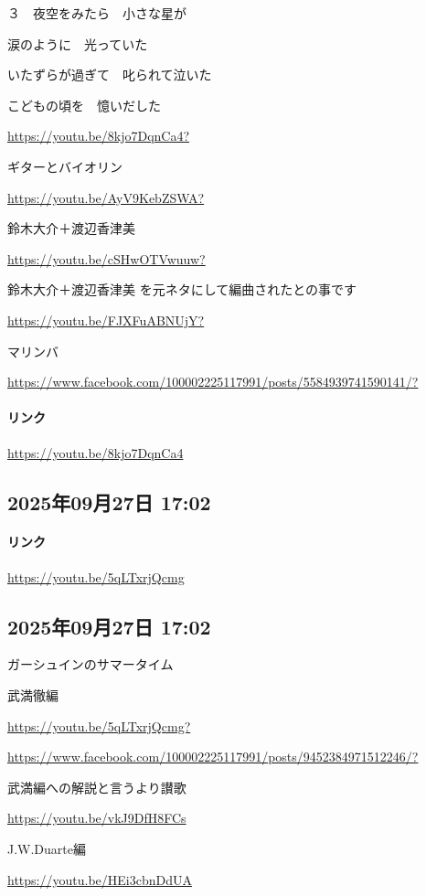 ３　夜空をみたら　小さな星が

涙のように　光っていた

いたずらが過ぎて　叱られて泣いた

こどもの頃を　憶いだした

\url{https://youtu.be/8kjo7DqnCa4?}

ギターとバイオリン

\url{https://youtu.be/AyV9KebZSWA?}

鈴木大介＋渡辺香津美

\url{https://youtu.be/cSHwOTVwuuw?}

鈴木大介＋渡辺香津美 を元ネタにして編曲されたとの事です

\url{https://youtu.be/FJXFuABNUjY?}

マリンバ

\url{https://www.facebook.com/100002225117991/posts/5584939741590141/?}

\paragraph{リンク}
\url{https://youtu.be/8kjo7DqnCa4}

\subsection*{2025年09月27日 17:02}

\paragraph{リンク}
\url{https://youtu.be/5qLTxrjQcmg}

\subsection*{2025年09月27日 17:02}

ガーシュインのサマータイム

武満徹編

\url{https://youtu.be/5qLTxrjQcmg?}

\url{https://www.facebook.com/100002225117991/posts/9452384971512246/?}

武満編への解説と言うより讃歌

\url{https://youtu.be/vkJ9DfH8FCs}

J.W.Duarte編

\url{https://youtu.be/HEi3cbnDdUA}

